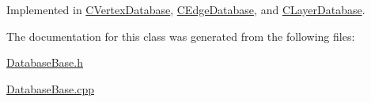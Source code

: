 Implemented in \hyperlink{class_c_vertex_database_ad78aba2fdfdf3de79ba0be14a4847bfa}{C\+Vertex\+Database}, \hyperlink{class_c_edge_database_a0ddac66f89b497c36df8472cecdd4e39}{C\+Edge\+Database}, and \hyperlink{class_c_layer_database_ae14a3945de89a103480cb36001ada125}{C\+Layer\+Database}.



The documentation for this class was generated from the following files\+:\begin{DoxyCompactItemize}
\item 
\hyperlink{_database_base_8h}{Database\+Base.\+h}\item 
\hyperlink{_database_base_8cpp}{Database\+Base.\+cpp}\end{DoxyCompactItemize}
